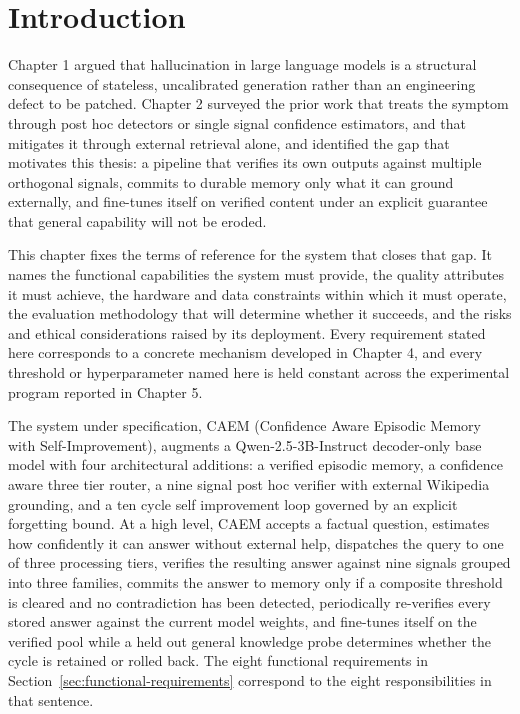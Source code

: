 
\section{Introduction}
\label{sec:ch3-intro}

Chapter 1 argued that hallucination in large language models is a structural consequence of stateless, uncalibrated generation rather than an engineering defect to be patched. Chapter 2 surveyed the prior work that treats the symptom through post hoc detectors or single signal confidence estimators, and that mitigates it through external retrieval alone, and identified the gap that motivates this thesis: a pipeline that verifies its own outputs against multiple orthogonal signals, commits to durable memory only what it can ground externally, and fine-tunes itself on verified content under an explicit guarantee that general capability will not be eroded.

This chapter fixes the terms of reference for the system that closes that gap. It names the functional capabilities the system must provide, the quality attributes it must achieve, the hardware and data constraints within which it must operate, the evaluation methodology that will determine whether it succeeds, and the risks and ethical considerations raised by its deployment. Every requirement stated here corresponds to a concrete mechanism developed in Chapter 4, and every threshold or hyperparameter named here is held constant across the experimental program reported in Chapter 5.

The system under specification, CAEM (Confidence Aware Episodic Memory with Self-Improvement), augments a Qwen-2.5-3B-Instruct decoder-only base model with four architectural additions: a verified episodic memory, a confidence aware three tier router, a nine signal post hoc verifier with external Wikipedia grounding, and a ten cycle self improvement loop governed by an explicit forgetting bound. At a high level, CAEM accepts a factual question, estimates how confidently it can answer without external help, dispatches the query to one of three processing tiers, verifies the resulting answer against nine signals grouped into three families, commits the answer to memory only if a composite threshold is cleared and no contradiction has been detected, periodically re-verifies every stored answer against the current model weights, and fine-tunes itself on the verified pool while a held out general knowledge probe determines whether the cycle is retained or rolled back. The eight functional requirements in Section~\ref{sec:functional-requirements} correspond to the eight responsibilities in that sentence.

